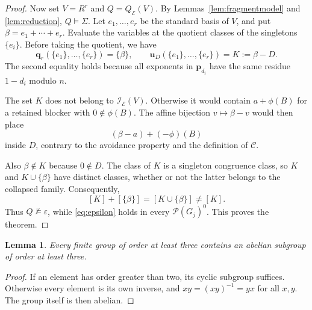 \documentclass[10pt,a4paper]{amsart}
\newtheorem{lemma}[theorem]{Lemma}
\numberwithin{equation}{section}
\newcommand{\Full}[1]{\mathcal{P}(#1)^0}
\newcommand{\bu}{\mathbf{u}}
\newcommand{\bq}{\mathbf{q}}
\newcommand{\bp}{\mathbf{p}}
\newcommand{\calI}{\mathcal{I}}
\newcommand{\calC}{\mathcal{C}}
\newcommand{\calE}{\mathcal{E}}
\begin{document}
\begin{proof}
Now set $V=R^r$ and $Q=Q_{\calE}(V)$. By Lemmas~\ref{lem:fragmentmodel} and \ref{lem:reduction}, $Q\models\Sigma$. Let $e_1,\ldots,e_r$ be the standard basis of $V$, and put $\beta=e_1+\cdots+e_r$. Evaluate the variables at the quotient classes of the singletons $\{e_i\}$. Before taking the quotient, we have
\begin{equation}\label{eq:evaluation}
 \bq_r(\{e_1\},\ldots,\{e_r\})=\{\beta\},\qquad
 \bu_D(\{e_1\},\ldots,\{e_r\})=K:=\beta-D.
\end{equation}
The second equality holds because all exponents in $\bp_{d_i}$ have the same residue $1-d_i$ modulo $n$.

The set $K$ does not belong to $\calI_{\calE}(V)$. Otherwise it would contain $a+\phi(B)$ for a retained blocker with $0\notin\phi(B)$. The affine bijection $v\mapsto\beta-v$ would then place
\[
 (\beta-a)+(-\phi)(B)
\]
inside $D$, contrary to the avoidance property and the definition of $\calC$.

Also $\beta\notin K$ because $0\notin D$. The class of $K$ is a singleton congruence class, so $K$ and $K\cup\{\beta\}$ have distinct classes, whether or not the latter belongs to the collapsed family. Consequently,
\[
 [K]+[\{\beta\}]=[K\cup\{\beta\}]\ne[K].
\]
Thus $Q\not\models\varepsilon$, while \eqref{eq:epsilon} holds in every $\Full{G_j}$. This proves the theorem.
\end{proof}

\begin{lemma}\label{lem:abeliansubgroup}
Every finite group of order at least three contains an abelian subgroup of order at least three.
\end{lemma}
\begin{proof}
If an element has order greater than two, its cyclic subgroup suffices. Otherwise every element is its own inverse, and $xy=(xy)^{-1}=yx$ for all $x,y$. The group itself is then abelian.
\end{proof}
\end{document}
